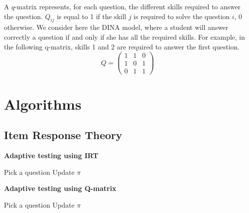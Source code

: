 \documentclass{sig-alternate}
\begin{document}
A $q$-matrix \cite{Takaoka} represents, for each question, the different skills required to answer the question. $Q_{ij}$ is equal to 1 if the skill $j$ is required to solve the question $i$, 0 otherwise. We consider here the DINA model, where a student will answer correctly a question if and only if she has all the required skills. For example, in the following q-matrix, skills 1 and 2 are required to answer the first question. %
\[ Q = \left(\begin{array}{lll}
1 & 1 & 0\\
1 & 0 & 1\\
0 & 1 & 1
\end{array}\right) \]





\section{Algorithms}


\subsection{Item Response Theory}


\begin{algorithm}
\caption*{\textbf{Adaptive testing using IRT}}
\begin{algorithmic}
	\State Pick a question
	\State Update $\pi$
\EndWhile
\EndProcedure
\end{algorithmic}
\end{algorithm}

\begin{algorithm}
\caption*{\textbf{Adaptive testing using Q-matrix}}
\begin{algorithmic}
	\State Pick a question
	\State Update $\pi$
\EndWhile
\EndProcedure
\end{algorithmic}
\end{algorithm}
\end{document}
